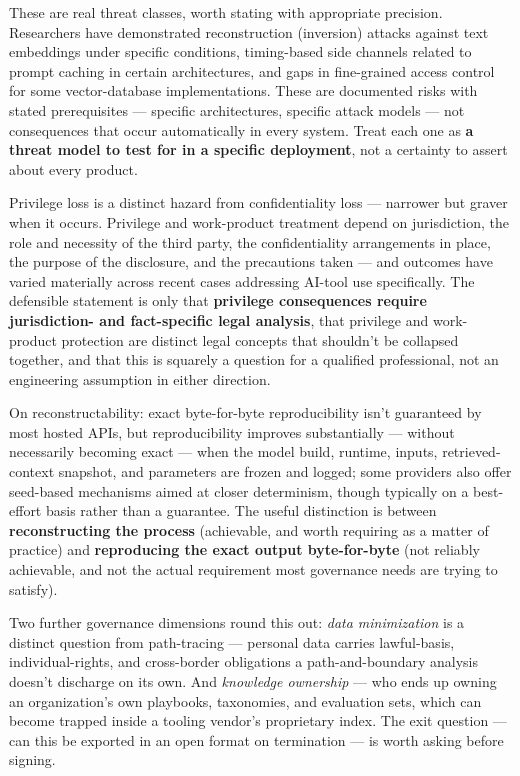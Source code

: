 These are real threat classes, worth stating with appropriate precision. Researchers have demonstrated reconstruction (inversion) attacks against text embeddings under specific conditions, timing-based side channels related to prompt caching in certain architectures, and gaps in fine-grained access control for some vector-database implementations. These are documented risks with stated prerequisites --- specific architectures, specific attack models --- not consequences that occur automatically in every system. Treat each one as \textbf{a threat model to test for in a specific deployment}, not a certainty to assert about every product.

Privilege loss is a distinct hazard from confidentiality loss --- narrower but graver when it occurs. Privilege and work-product treatment depend on jurisdiction, the role and necessity of the third party, the confidentiality arrangements in place, the purpose of the disclosure, and the precautions taken --- and outcomes have varied materially across recent cases addressing AI-tool use specifically. The defensible statement is only that \textbf{privilege consequences require jurisdiction- and fact-specific legal analysis}, that privilege and work-product protection are distinct legal concepts that shouldn't be collapsed together, and that this is squarely a question for a qualified professional, not an engineering assumption in either direction.

On reconstructability: exact byte-for-byte reproducibility isn't guaranteed by most hosted APIs, but reproducibility improves substantially --- without necessarily becoming exact --- when the model build, runtime, inputs, retrieved-context snapshot, and parameters are frozen and logged; some providers also offer seed-based mechanisms aimed at closer determinism, though typically on a best-effort basis rather than a guarantee. The useful distinction is between \textbf{reconstructing the process} (achievable, and worth requiring as a matter of practice) and \textbf{reproducing the exact output byte-for-byte} (not reliably achievable, and not the actual requirement most governance needs are trying to satisfy).

Two further governance dimensions round this out: \emph{data minimization} is a distinct question from path-tracing --- personal data carries lawful-basis, individual-rights, and cross-border obligations a path-and-boundary analysis doesn't discharge on its own. And \emph{knowledge ownership} --- who ends up owning an organization's own playbooks, taxonomies, and evaluation sets, which can become trapped inside a tooling vendor's proprietary index. The exit question --- can this be exported in an open format on termination --- is worth asking before signing.
